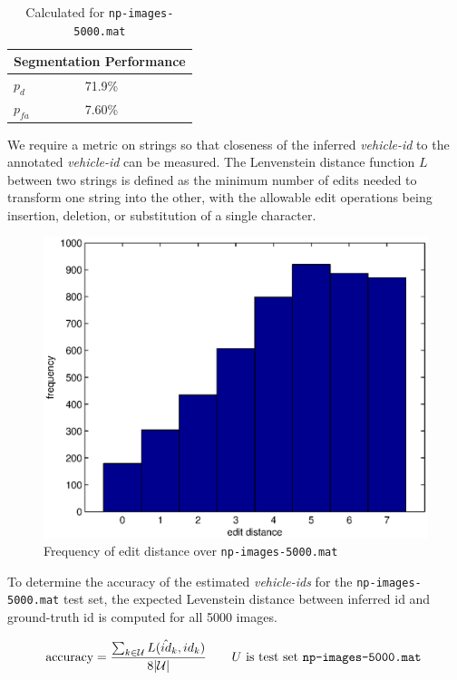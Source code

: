 \documentclass[a4paper,12pt]{article}
\begin{document}
\begin{table}[ht]
\begin{center}
\begin{tabular}{|l|l|}
  \hline
  \multicolumn{2}{|c|}{Segmentation Performance} \\
  \hline
  $p_d$ & 71.9\% \\
  $p_{fa}$ & 7.60\% \\
  \hline
\end{tabular}
\caption{Calculated for \texttt{np-images-5000.mat}}
\end{center}
\end{table}

We require a metric on strings so that closeness of the inferred
\emph{vehicle-id} to the annotated \emph{vehicle-id} can be
measured. The Lenvenstein distance function $L$ between two strings is
defined as the minimum number of edits needed to transform one string
into the other, with the allowable edit operations being insertion,
deletion, or substitution of a single character. 

\begin{figure}[ht]
\begin{center}
\includegraphics[width=0.75\linewidth]{matlab/hamming.eps}
\caption{ Frequency of edit distance over \texttt{np-images-5000.mat}  } 
\label{fig:editdistance}
\end{center}
\end{figure}

To determine the accuracy of the estimated \emph{vehicle-ids} for the
\texttt{np-images-5000.mat} test set, the expected Levenstein distance
between inferred id and ground-truth id is computed for all 5000
images.

\[ \text{accuracy} = \frac{\sum_{k \in \mathcal{U}}
  L(\hat{id}_k,id_k)}{8|\mathcal{U}|} \qquad U \text{ is test set
  \texttt{np-images-5000.mat} }  \]
\end{document}
